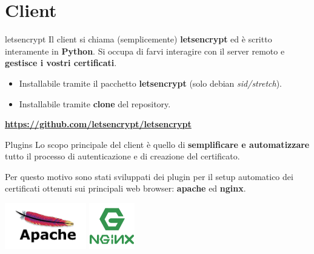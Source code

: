 \documentclass[xcolor=svgnames,11pt]{beamer}
\begin{document}
\section{Client}

\begin{frame}{letsencrypt}
Il client si chiama (semplicemente) \textbf{letsencrypt} ed è scritto interamente in \textbf{Python}.
Si occupa di farvi interagire con il server remoto e \textbf{gestisce i vostri certificati}.
\pause
\begin{itemize}
  \item Installabile tramite il pacchetto \textbf{letsencrypt} (solo debian \emph{sid/stretch}).
  \item Installabile tramite \textbf{clone} del repository.
\end{itemize}
\pause
\begin{center}
 \textbf{\url{https://github.com/letsencrypt/letsencrypt}}
\end{center}
\end{frame}

\begin{frame}{Plugins}
Lo scopo principale del client è quello di \textbf{semplificare e automatizzare} tutto il processo di
autenticazione e di creazione del certificato.

\medskip\pause

Per questo motivo sono stati sviluppati dei plugin per il setup automatico dei certificati ottenuti
sui principali web browser: \textbf{apache} ed \textbf{nginx}.

\begin{center}
\includegraphics[height=2cm]{img/apache_logo.png}
\includegraphics[height=2cm]{img/nginx_logo.png}
\end{center}

\end{frame}
\end{document}
